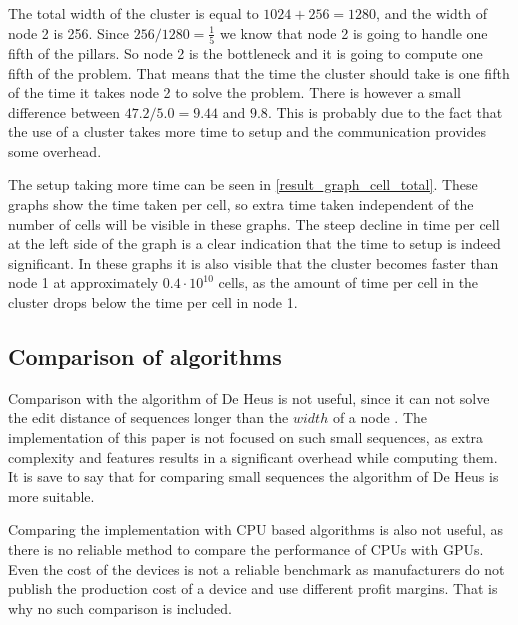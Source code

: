 The total width of the cluster is equal to $1024 + 256 = 1280$, and the width of node 2 is 256.
Since $256 / 1280 = \frac{1}{5}$ we know that node 2 is going to handle one fifth of the pillars.
So node 2 is the bottleneck and it is going to compute one fifth of the problem.
That means that the time the cluster should take is one fifth of the time it takes node 2 to solve the problem.
There is however a small difference between $47.2 / 5.0 = 9.44$ and $9.8$.
This is probably due to the fact that the use of a cluster takes more time to setup and the communication provides some overhead.

The setup taking more time can be seen in \cref{result_graph_cell_total}.
These graphs show the time taken per cell, so extra time taken independent of the number of cells will be visible in these graphs.
The steep decline in time per cell at the left side of the graph is a clear indication that the time to setup is indeed significant.
In these graphs it is also visible that the cluster becomes faster than node 1 at approximately $0.4 \cdot 10^{10}$ cells, as the amount of time per cell in the cluster drops below the time per cell in node 1.

\subsection{Comparison of algorithms}
Comparison with the algorithm of De Heus is not useful, since it can not solve the edit distance of sequences longer than the $width$ of a node \cite{Heus}.
The implementation of this paper is not focused on such small sequences, as extra complexity and features results in a significant overhead while computing them.
It is save to say that for comparing small sequences the algorithm of De Heus is more suitable.

Comparing the implementation with CPU based algorithms is also not useful, as there is no reliable method to compare the performance of CPUs with GPUs.
Even the cost of the devices is not a reliable benchmark as manufacturers do not publish the production cost of a device and use different profit margins.
That is why no such comparison is included.

